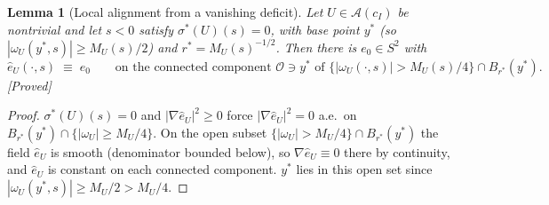 \documentclass[11pt]{article}
\newtheorem{lemma}[theorem]{Lemma}
\theoremstyle{definition}
\theoremstyle{remark}
\begin{document}
\begin{lemma}[Local alignment from a vanishing deficit]\label{lem:alignment-local}
  Let $U\in\mathcal{A}(c_I)$ be nontrivial and let $s<0$ satisfy
  $\sigma^*(U)(s)=0$, with base point $y^*$ (so
  $|\omega_U(y^*,s)|\geq M_U(s)/2$) and $r^*=M_U(s)^{-1/2}$. Then there is
  $e_0\in S^2$ with
  \[
    \hat e_U(\cdot,s) \;\equiv\; e_0
    \qquad\text{on the connected component } \mathcal{O}\ni y^*
    \text{ of } \bigl\{|\omega_U(\cdot,s)|>M_U(s)/4\bigr\}\cap B_{r^*}(y^*).
  \]
  \emph{[Proved]}
\end{lemma}
\begin{proof}
  $\sigma^*(U)(s)=0$ and $|\nabla\hat e_U|^2\geq0$ force
  $|\nabla\hat e_U|^2=0$ a.e.\ on
  $B_{r^*}(y^*)\cap\{|\omega_U|\geq M_U/4\}$. On the open subset
  $\{|\omega_U|>M_U/4\}\cap B_{r^*}(y^*)$ the field $\hat e_U$ is smooth
  (denominator bounded below), so $\nabla\hat e_U\equiv0$ there by
  continuity, and $\hat e_U$ is constant on each connected component.
  $y^*$ lies in this open set since $|\omega_U(y^*,s)|\geq M_U/2>M_U/4$.
\end{proof}
\end{document}

